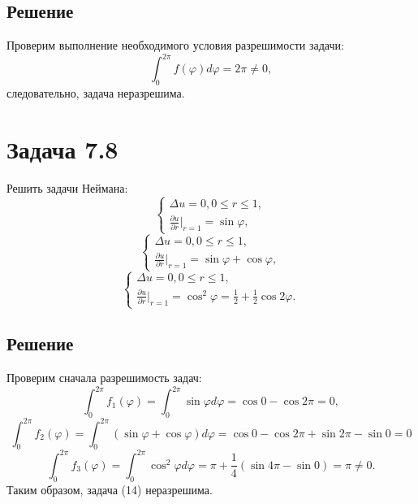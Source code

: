 \documentclass[11pt]{article}
\begin{document}
\subsection{Решение}
\label{sec:org64f1f70}
Проверим выполнение необходимого условия разрешимости задачи:
\begin{equation*}
\int_0^{2\pi}f(\varphi)d\varphi = 2\pi \neq 0,
\end{equation*}
следовательно, задача неразрешима.
\section{Задача 7.8}
\label{sec:orgfd253f8}
Решить задачи Неймана:
\begin{equation}
\begin{cases}
\Delta u = 0, 0 \leq r \leq 1, \\
\frac{\partial u}{\partial r}\bigg|_{r = 1} = \sin\varphi,
\end{cases}
\end{equation}
\begin{equation}
\begin{cases}
\Delta u = 0, 0 \leq r \leq 1, \\
\frac{\partial u}{\partial r}\bigg|_{r = 1} = \sin\varphi + \cos\varphi,
\end{cases}
\end{equation}
\begin{equation}
\begin{cases}
\Delta u = 0, 0 \leq r \leq 1, \\
\frac{\partial u}{\partial r}\bigg|_{r = 1} = \cos^2\varphi = \frac12 + \frac12\cos2\varphi.
\end{cases}
\end{equation}
\subsection{Решение}
\label{sec:org384f0d9}
Проверим сначала разрешимость задач:
\begin{equation*}
\int_0^{2\pi}f_1(\varphi) = \int_0^{2\pi}\sin\varphi d\varphi = \cos0 - \cos2\pi = 0,
\end{equation*}
\begin{equation*}
\int_0^{2\pi}f_2(\varphi) = \int_0^{2\pi}(\sin\varphi + \cos\varphi)d\varphi =
\cos0 - \cos2\pi + \sin2\pi - \sin0 = 0
\end{equation*}
\begin{equation*}
\int_0^{2\pi}f_3(\varphi) = \int_0^{2\pi}\cos^2\varphi d\varphi = \pi + \frac14(\sin4\pi - \sin0) = \pi \neq 0.
\end{equation*}
Таким образом, задача (14) неразрешима.
\end{document}
